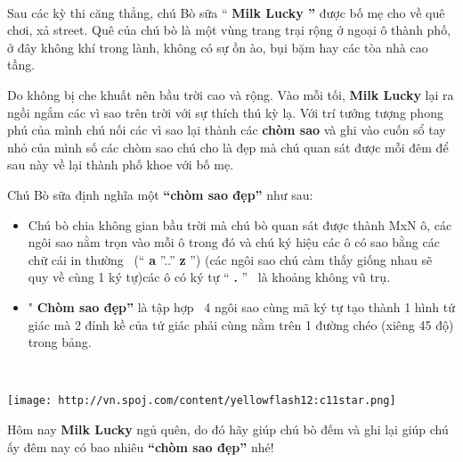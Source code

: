  

Sau các kỳ thi căng thẳng, chú Bò sữa “ \textbf{ Milk Lucky ” } được bố mẹ cho về quê chơi, xả street. Quê của chú bò là một vùng trang trại rộng ở ngoại ô thành phố, ở đây không khí trong lành, không có sự ồn ào, bụi bặm hay các tòa nhà cao tầng.

Do không bị che khuất nên bầu trời cao và rộng. Vào mỗi tối, \textbf{ Milk Lucky } lại ra ngồi ngắm các vì sao trên trời với sự thích thú kỳ lạ. Với trí tưởng tượng phong phú của mình chú nối các vì sao lại thành các \textbf{ chòm sao } và ghi vào cuốn sổ tay nhỏ của mình số các chòm sao chú cho là đẹp mà chú quan sát được mỗi đêm để sau này về lại thành phố khoe với bố mẹ.

Chú Bò sữa định nghĩa một \textbf{“chòm sao đẹp”} như sau:
\begin{itemize}
	\item Chú bò chia không gian bầu trời mà chú bò quan sát được thành MxN ô, các ngôi sao nằm trọn vào mỗi ô trong đó và chú ký hiệu các ô có sao bằng các chữ cái in thường  (“ \textbf{ a } ”..” \textbf{ z } ”) (các ngôi sao chú càm thấy giống nhau sẽ quy về cùng 1 ký tự)các ô có ký tự “ \textbf{ . } ”  là khoảng không vũ trụ.
	\item " \textbf{Chòm sao đẹp”} là tập hợp  4 ngôi sao cùng mã ký tự tạo thành 1 hình tứ giác mà 2 đỉnh kề của tứ giác phải cùng nằm trên 1 đường chéo (xiêng 45 độ) trong bảng.
\end{itemize}

 


\texttt{[image: http://vn.spoj.com/content/yellowflash12:c11star.png]}

Hôm nay \textbf{Milk Lucky} ngủ quên, do đó hãy giúp chú bò đếm và ghi lại giúp chú ấy đêm nay có bao nhiêu \textbf{“chòm sao đẹp”} nhé!
\begin{itemize}
\end{itemize}